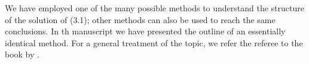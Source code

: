 \documentclass[letterpaper,10pt]{article}
\newcommand{\Ndg}{\tilde{N}_g}
\begin{document}
% 
% 
We have employed one of the many possible methods to understand the structure of the solution of (3.1); other methods can also be used to reach the same conclusions.
In th manuscript we have presented the outline of an essentially identical method.
For a general treatment of the topic, we refer the referee to the book by \cite{Hinch1991}. %


\newpage
{}

% 
% 
% 
% 
% 
% 
% 
\end{document}
